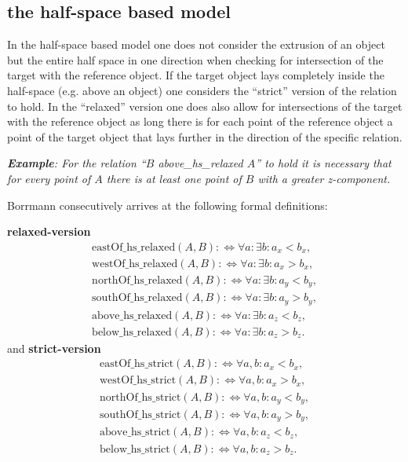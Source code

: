 \documentclass[paper=a4, fontsize=11pt]{scrartcl} %
\numberwithin{equation}{section} %
\numberwithin{figure}{section} %
\numberwithin{table}{section} %
\begin{document}
\subsection{the half-space based model}\label{sec:half-space-based-model}
In the half-space based model one does not consider the extrusion of an object but the entire half space in one direction when checking for intersection of the target with the reference object. If the target object lays completely inside the half-space (e.g. above an object) one considers the ``strict''  version of the relation to hold. In the ``relaxed'' version one does also allow for intersections of the target with the reference object as long there is for each point of the reference object a point of the target object that lays further in the direction of the specific relation. 


\textit{\textbf{Example}: For the relation ``$B$ above\_hs\_relaxed $A$'' to hold it is necessary that for every point of $A$ there is at least one point of $B$ with a greater z-component. 
}

Borrmann consecutively arrives at the following formal definitions:


\textbf{relaxed-version}
\begin{align*}
  \mathrm{eastOf\_hs\_relaxed}(A,B) :\Leftrightarrow \forall a:\exists b: a_x<b_x,  \\
  \mathrm{westOf\_hs\_relaxed}(A,B) :\Leftrightarrow \forall a:\exists b: a_x>b_x,  \\
  \mathrm{northOf\_hs\_relaxed}(A,B) :\Leftrightarrow \forall a:\exists b: a_y<b_y, \\
  \mathrm{southOf\_hs\_relaxed}(A,B) :\Leftrightarrow \forall a:\exists b: a_y>b_y, \\
  \mathrm{above\_hs\_relaxed}(A,B) :\Leftrightarrow \forall a:\exists b: a_z<b_z,   \\
  \mathrm{below\_hs\_relaxed}(A,B) :\Leftrightarrow \forall a:\exists b: a_z>b_z. 
\end{align*}
 and
\textbf{strict-version}
\begin{align*}
  \mathrm{eastOf\_hs\_strict}(A,B) :\Leftrightarrow \forall a,b: a_x<b_x,  \\
  \mathrm{westOf\_hs\_strict}(A,B) :\Leftrightarrow \forall a,b: a_x>b_x,  \\
  \mathrm{northOf\_hs\_strict}(A,B) :\Leftrightarrow \forall a,b: a_y<b_y, \\
  \mathrm{southOf\_hs\_strict}(A,B) :\Leftrightarrow \forall a,b: a_y>b_y, \\
  \mathrm{above\_hs\_strict}(A,B) :\Leftrightarrow \forall a,b: a_z<b_z,   \\
  \mathrm{below\_hs\_strict}(A,B) :\Leftrightarrow \forall a,b: a_z>b_z. 
\end{align*}
\end{document}
